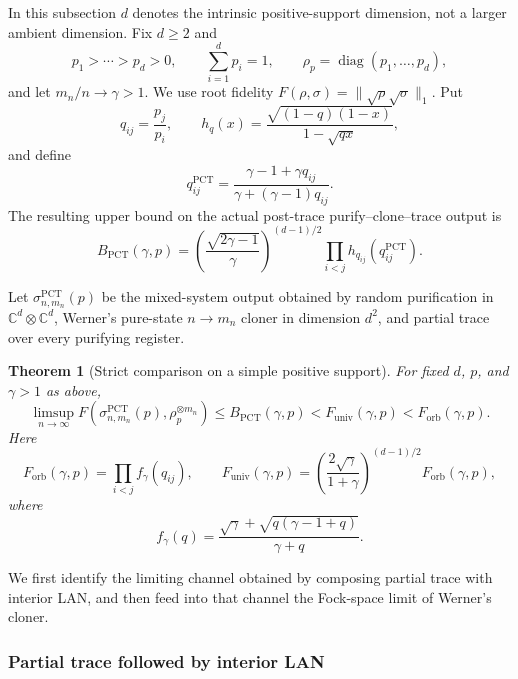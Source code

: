 \documentclass[11pt]{article}
\newtheorem{theorem}{Theorem}[section]
\theoremstyle{remark}
\theoremstyle{plain}
\newcommand{\C}{\mathbb C}
\newcommand{\diag}{\operatorname{diag}}
\newcommand{\ot}{\otimes}
\newcommand{\Forb}{F_{\mathrm{orb}}}
\newcommand{\Funiv}{F_{\mathrm{univ}}}
\begin{document}
In this subsection \(d\) denotes the intrinsic positive-support dimension,
not a larger ambient dimension.  Fix \(d\ge2\) and
\[
  p_1>\cdots>p_d>0,
  \qquad \sum_{i=1}^d p_i=1,
  \qquad \rho_p=\diag(p_1,\ldots,p_d),
\]
and let \(m_n/n\to\gamma>1\).  We use root fidelity
\(F(\rho,\sigma)=\|\sqrt\rho\sqrt\sigma\|_1\).  Put
\[
  q_{ij}=\frac{p_j}{p_i},
  \qquad
  h_q(x)=\frac{\sqrt{(1-q)(1-x)}}{1-\sqrt{qx}},
\]
and define
\begin{equation}\label{eq:q-pct}
  q_{ij}^{\mathrm{PCT}}
  =\frac{\gamma-1+\gamma q_{ij}}
         {\gamma+(\gamma-1)q_{ij}}.
\end{equation}
The resulting upper bound on the actual post-trace purify--clone--trace output is
\begin{equation}\label{eq:B-pct}
  B_{\mathrm{PCT}}(\gamma,p)
  =\left(\frac{\sqrt{2\gamma-1}}{\gamma}\right)^{(d-1)/2}
   \prod_{i<j}h_{q_{ij}}\!\left(q_{ij}^{\mathrm{PCT}}\right).
\end{equation}

Let \(\sigma_{n,m_n}^{\mathrm{PCT}}(p)\) be the mixed-system output obtained
by random purification in \(\C^d\ot\C^d\), Werner's pure-state
\(n\to m_n\) cloner in dimension \(d^2\), and partial trace over every
purifying register.

\begin{theorem}[Strict comparison on a simple positive support]
\label{thm:general-pct}
For fixed \(d\), \(p\), and \(\gamma>1\) as above,
\begin{equation}\label{eq:main-upper}
  \limsup_{n\to\infty}
  F\!\left(
    \sigma_{n,m_n}^{\mathrm{PCT}}(p),
    \rho_p^{\ot m_n}
  \right)
  \le B_{\mathrm{PCT}}(\gamma,p)
  <\Funiv(\gamma,p)<\Forb(\gamma,p).
\end{equation}
Here
\[
  \Forb(\gamma,p)=\prod_{i<j}f_\gamma(q_{ij}),
  \qquad
  \Funiv(\gamma,p)
  =\left(\frac{2\sqrt\gamma}{1+\gamma}\right)^{(d-1)/2}
   \Forb(\gamma,p),
\]
where
\[
  f_\gamma(q)
  =\frac{\sqrt\gamma+\sqrt{q(\gamma-1+q)}}{\gamma+q}.
\]
\end{theorem}

We first identify the limiting
channel obtained by composing partial trace with interior LAN, and then feed into
that channel the Fock-space limit of Werner's cloner.

\subsubsection{Partial trace followed by interior LAN}
\end{document}
